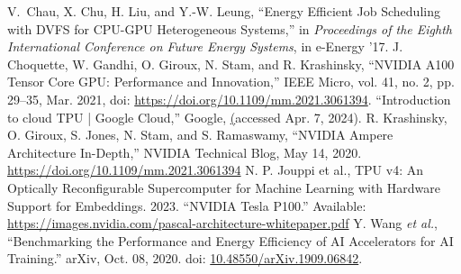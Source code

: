 \begin{thebibliography}{00}
     V. Chau, X. Chu, H. Liu, and Y.-W. Leung,
``Energy Efficient Job Scheduling with DVFS for CPU-GPU Heterogeneous Systems,'' in \textit{Proceedings of the Eighth International Conference on Future Energy Systems},
in e-Energy ’17.
 J. Choquette, W. Gandhi, O. Giroux, N. Stam, and R. Krashinsky, ``NVIDIA A100 Tensor Core GPU: Performance and Innovation,'' IEEE Micro, vol. 41, no. 2, pp. 29–35, Mar. 2021, doi: \href{https://doi.org/10.1109/mm.2021.3061394}{https://doi.org/10.1109/mm.2021.3061394}.
 ``Introduction to cloud TPU  |  Google Cloud,'' Google, \href{https://cloud.google.com/tpu/docs/intro-to-tpu} (accessed Apr. 7, 2024).
 R. Krashinsky, O. Giroux, S. Jones, N. Stam, and S. Ramaswamy, ``NVIDIA Ampere Architecture In-Depth,'' NVIDIA Technical Blog, May 14, 2020. \href{https://developer.nvidia.com/blog/nvidia-ampere-architecture-in-depth/}{https://doi.org/10.1109/mm.2021.3061394}
     N. P. Jouppi et al., TPU v4: An Optically Reconfigurable Supercomputer for Machine Learning with Hardware Support for Embeddings. 2023.
 ``NVIDIA Tesla P100.'' Available: \href{https://images.nvidia.com/content/pdf/tesla/whitepaper/pascal-architecture-whitepaper.pdf}{https://images.nvidia.com/pascal-architecture-whitepaper.pdf}
 Y. Wang \textit{et al.}, “Benchmarking the Performance and Energy Efficiency of AI Accelerators for AI Training.” arXiv, Oct. 08, 2020. doi: \href{https://doi.org/10.48550/arXiv.1909.06842}{10.48550/arXiv.1909.06842}.
\end{thebibliography}